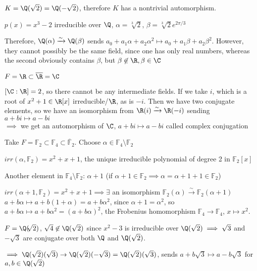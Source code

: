 \documentclass[10pt]{article}
\newcommand{\F}{\mathbb{F}}
\begin{document}
$K = \Q(\sqrt{2}) = \Q(-\sqrt{2})$, therefore $K$ has a nontrivial automorphism.

\begin{exm*}
    $p(x) = x^3 - 2$ irreducible over $\Q$, $\alpha = \sqrt[3]{2}$, $\beta = \sqrt[3]{2}e^{2\pi/3}$
\end{exm*}
Therefore, $\Q(\alpha) \xrightarrow{\sim} \Q(\beta)$ sends $a_0 + a_1 \alpha + a_2 \alpha^2 \mapsto a_0 + a_1\beta + a_2\beta^2$. However, they cannot possibly be the same field, since one has only real numbers, whereas the second obviously contains $\beta$, but $\beta \not\in \R, \beta \in \C$

\begin{exm*}
    $F = \R \subset \overline{\R} = \C$
\end{exm*}
$[\C: \R] = 2$, so there cannot be any intermediate fields. If we take $i$, which is a root of $x^2 + 1 \in \R[x]$ irreducible/$\R$, as is $-i$. Then we have two conjugate elements, so we have an isomorphism from $\R(i) \xrightarrow{\sim} \R(-i)$ sending $a + bi \mapsto a - bi$\\
$\implies$ we get an automorphism of $\C$, $a + bi \mapsto a - bi$ called complex conjugation

\begin{exm*}
    Take $F = \F_2 \subset \F_4 \subset \overline{\F}_2$. Choose $\alpha \in \F_4 \setminus \F_2$
\end{exm*}
$irr(\alpha, \F_2) = x^2 + x + 1$, the unique irreducible polynomial of degree 2 in $\F_2[x]$

Another element in $\F_4 \setminus \F_2$: $\alpha + 1$ (if $\alpha + 1 \in \F_2 \implies \alpha = \alpha + 1 + 1 \in \F_2$)

$irr(\alpha + 1, \F_2) = x^2 + x + 1 \implies \exists$ an isomorphism $\F_2(\alpha) \xrightarrow{\sim} \F_2(\alpha + 1)$ $a + b \alpha \mapsto a + b(1 + \alpha) = a + b\alpha^2$, since $\alpha + 1 = \alpha^2$, so $a + b\alpha \mapsto a + b\alpha^2 = (a + b\alpha)^2$, the Frobenius homomorphism $\F_4 \to \F_4$, $x\mapsto x^2$.

\begin{exm*}
    $F = \Q(\sqrt[]{2})$, $\sqrt{4} \not\in \Q(\sqrt{2})$ since $x^2 - 3$ is irreducible over $\Q(\sqrt{2}) \implies \sqrt{3}$ and $-\sqrt{3}$ are conjugate over both $\Q$ and $\Q(\sqrt{2})$.
\end{exm*}
$\implies \Q(\sqrt{2})(\sqrt{3}) \to \Q(\sqrt{2})(-\sqrt{3}) = \Q(\sqrt{2})(\sqrt{3})$, sends $a + b\sqrt{3} \mapsto a - b\sqrt{3}$ for $a, b \in \Q(\sqrt{2})$
\end{document}
